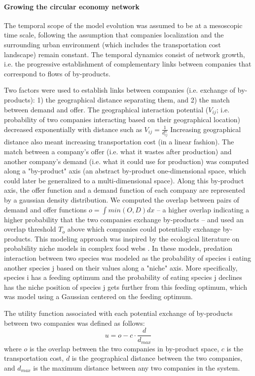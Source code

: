 \documentclass[fleqn,10pt]{wlscirep}
\begin{document}
\paragraph*{Growing the circular economy network}

The temporal scope of the model evolution was assumed to be at a mesoscopic time scale, following the assumption that companies localization and the surrounding urban environment (which includes the transportation cost landscape) remain constant. The temporal dynamics consist of network growth, i.e. the progressive establishment of complementary links between companies that correspond to flows of by-products.

Two factors were used to establish links between companies (i.e. exchange of by-products): 1) the geographical distance separating them, and 2) the match between demand and offer. The geographical interaction potential ($V_{ij}$; i.e. probability of two companies interacting based on their geographical location) decreased exponentially with distance such as $V_{ij}=\frac{1}{d_{ij}^{\alpha}}$ %
Increasing geographical distance also meant increasing transportation cost (in a linear fashion). The match between a company's offer (i.e. what it wastes after production) and another company's demand (i.e. what it could use for production) was computed along a "by-product" axis (an abstract by-product one-dimensional space, which could later be generalized to a multi-dimensional space). Along this by-product axis, the offer function and a demand function of each company are represented by a gaussian density distribution. We computed the overlap between pairs of demand and offer functions \(o = \int min(O,D) dx\) – a higher overlap indicating a higher probability that the two companies exchange by-products – and used an overlap threshold $T_o$ above which companies could potentially exchange by-products. This modeling approach was inspired by the ecological literature on probability niche models in complex food webs \cite{williams2000simple,williams2010probabilistic}. In these models, predation interaction between two species was modeled as the probability of species i eating another species j based on their values along a "niche" axis. More specifically, species i has a feeding optimum and the probability of eating species j declines has the niche position of species j gets further from this feeding optimum, which was model using a Gaussian centered on the feeding optimum. 

The utility function associated with each potential exchange of by-products between two companies was defined as follows:
\[
u = o - c \cdot \frac{d}{d_{max}}
\]
where $o$ is the overlap between the two companies in by-product space, $c$ is the transportation cost, $d$ is the geographical distance between the two companies, and $d_{max}$ is the maximum distance between any two companies in the system.
\end{document}
